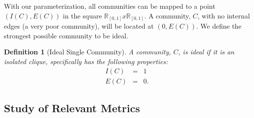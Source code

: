 \documentclass[phd,tocprelim]{cornell}
\newtheorem{definition}{Definition}
\begin{document}
With our parameterization, all communities can be mapped to a point $(I(C), E(C))$ in the square $\mathbb{R}_{[0, 1]} x \mathbb{R}_{[0, 1]}$.  A community, $C$, with no internal edges (a very poor community), will be located at $(0,E(C))$.  We define the strongest possible community to be ideal.
\begin{definition}[Ideal Single Community]
A community, $C$, is ideal if it is an isolated clique, specifically has the following properties:
\begin{eqnarray*}
I(C) &=& 1\\
E(C) &=& 0.
\end{eqnarray*}
\end{definition}


\subsection{Study of Relevant Metrics}
\end{document}
